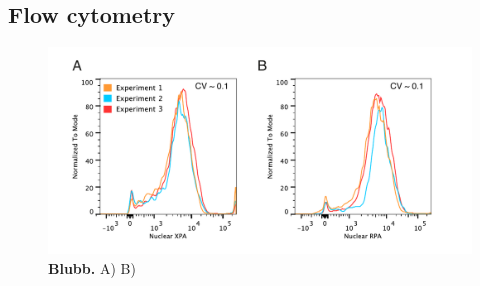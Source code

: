 
\subsection{Flow cytometry}
\begin{figure}[htbp]
	\begin{center}
		\includegraphics[width=1\textwidth]{Abbildungen/figure4_4.pdf}
		\caption{\textbf{Blubb.} A) B) }
		\label{fig:FC_proteindistribution}
	\end{center}
\end{figure}


